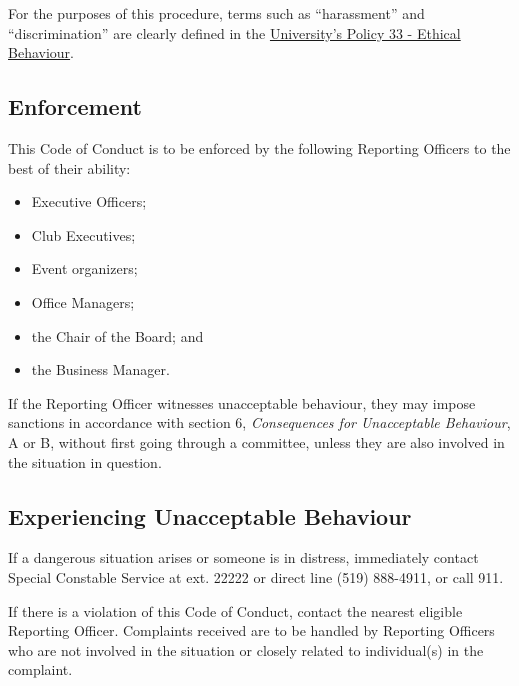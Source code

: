 For the purposes of this procedure, terms such as ``harassment'' and ``discrimination'' are clearly defined in the \href{https://uwaterloo.ca/secretariat/policies-procedures-guidelines/policy-33}{University's Policy 33 - Ethical Behaviour}.

\subsection{Enforcement}
This Code of Conduct is to be enforced by the following Reporting Officers to the best of their ability:
\begin{itemize}
	\item Executive Officers;
	\item Club Executives;
	\item Event organizers; 
	\item Office Managers;
	\item the Chair of the Board; and
	\item the Business Manager.
\end{itemize}
If the Reporting Officer witnesses unacceptable behaviour, they may impose sanctions in accordance with section 6, \textit{Consequences for Unacceptable Behaviour}, A or B, without first going through a committee, unless they are also involved in the situation in question.

\subsection{Experiencing Unacceptable Behaviour}
If a dangerous situation arises or someone is in distress, immediately contact Special Constable Service at ext. 22222 or direct line (519) 888-4911, or call 911.

If there is a violation of this Code of Conduct, contact the nearest eligible Reporting Officer. Complaints received are to be handled by Reporting Officers who are not involved in the situation or closely related to individual(s) in the complaint.

